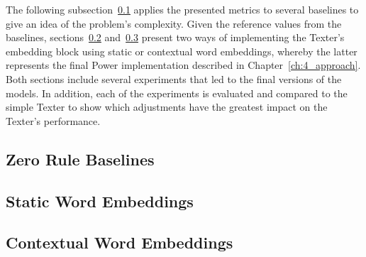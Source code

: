 The following subsection~\ref{subsec:5_experiments/4_texter/1_zero_rule}  applies the presented metrics to several baselines to give an idea of the problem's complexity. Given the reference values from the baselines, sections~\ref{subsec:5_experiments/4_texter/2_static} and~\ref{subsec:5_experiments/4_texter/3_context} present two ways of implementing the Texter's embedding block using static or contextual word embeddings, whereby the latter represents the final Power implementation described in Chapter~\ref{ch:4_approach}. Both sections include several experiments that led to the final versions of the models. In addition, each of the experiments is evaluated and compared to the simple Texter to show which adjustments have the greatest impact on the Texter's performance.

\subsection{Zero Rule Baselines}
\label{subsec:5_experiments/4_texter/1_zero_rule}


\subsection{Static Word Embeddings}
\label{subsec:5_experiments/4_texter/2_static}


\subsection{Contextual Word Embeddings}
\label{subsec:5_experiments/4_texter/3_context}

